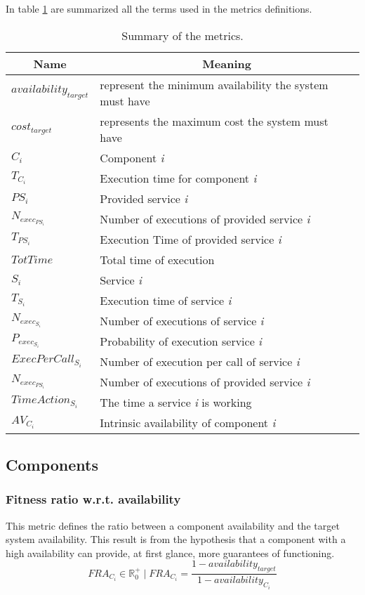 In table \ref{tab:new-metrics-summary} are summarized all the terms used in the metrics definitions.

\begin{table}[ht!b]
	\centering
	\begin{tabular}{|l|l|}
		\hline
		\multicolumn{1}{|c|}{Name} & \multicolumn{1}{c|}{Meaning} \\
		\hline 
		$availability_{target}$ & represent the minimum availability the system must have \\
		\hline
		$cost_{target}$ & represents the maximum cost the system must have \\ 
		\hline
		$C_i$ & Component \emph{i} \\ 
		\hline
		$T_{C_i}$ & Execution time for component \emph{i} \\
		\hline
		$PS_i$ & Provided service \emph{i} \\
		\hline
		$N_{exec_{PS_i}}$ & Number of executions of provided service \emph{i} \\
		\hline
		$T_{PS_i}$ & Execution Time of provided service \emph{i} \\
		\hline
		$TotTime$ & Total time of execution \\
		\hline
		$S_i$ & Service \emph{i} \\
		\hline
		$T_{S_i}$ & Execution time of service \emph{i} \\
		\hline
		$N_{exec_{S_i}}$ & Number of executions of service \emph{i} \\
		\hline
		$P_{exec_{S_i}}$ & Probability of execution service \emph{i} \\
		\hline
		$ExecPerCall_{S_i}$ & Number of execution per call of service \emph{i} \\
		\hline
		$N_{exec_{PS_i}}$ &  Number of executions of provided service \emph{i} \\
		\hline
		$TimeAction_{S_i}$ & The time a service \emph{i} is working \\
		\hline
		$AV_{C_i}$ & Intrinsic availability of component \emph{i} \\
		\hline
	\end{tabular} 
	\caption[New Metrics]{Summary of the metrics.}
	\label{tab:new-metrics-summary}
\end{table}

\subsection{Components}
\subsubsection{Fitness ratio w.r.t. availability}
This metric defines the ratio between a component availability and the target system availability. This result is from the hypothesis that a component with a high availability can provide, at first glance, more guarantees of functioning. 
\[ FRA_{C_i} \in \mathbb{R}^+_0 \; | \; FRA_{C_i} = \frac{1 - availability_{target}}{1- availability_{C_i}} \]

